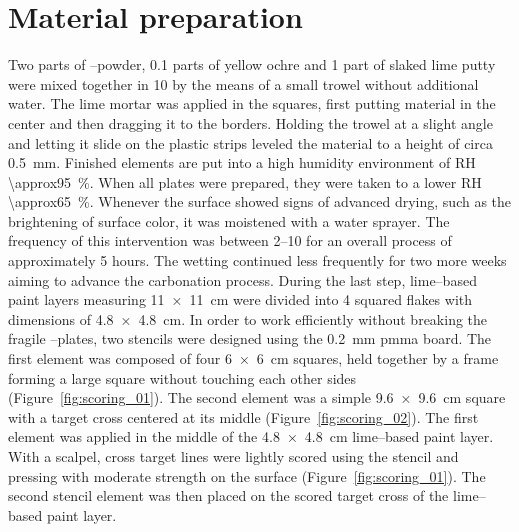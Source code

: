 \documentclass[review]{elsarticle}
\begin{document}
\section{Material preparation}
Two parts of --powder, 0.1 parts of yellow ochre and 1 part of slaked lime putty were mixed together in \SI{10}{\minutes} by the means of a small trowel without additional water.
The lime mortar was applied in the squares, first putting material in the center and then dragging it to the borders.
Holding the trowel at a slight angle and letting it slide on the plastic strips leveled the material to a height of circa \SI{0.5}{\mm}.
Finished elements are put into a high humidity environment of RH \SI{\approx95}{\percent}.
When all plates were prepared, they were taken to a lower RH \SI{\approx65}{\percent}.
Whenever the surface showed signs of advanced drying, such as the brightening of surface color, it was moistened with a water sprayer.
The frequency of this intervention was between \SIrange{2}{10}{\minutes} for an overall process of approximately 5 hours.
The wetting continued less frequently for two more weeks aiming to advance the carbonation process.
During the last step, lime--based paint layers measuring \SI[product-units = single]{11 x 11}{\cm} were divided into 4 squared flakes with dimensions of \SI[product-units = single]{4.8 x 4.8}{\cm}.
In order to work efficiently without breaking the fragile --plates, two stencils were designed using the \SI{0.2}{\mm} \gls{pmma} board.
The first element was composed of four  \SI[product-units = single]{6 x 6}{\cm} squares, held together by a frame forming a large square without touching each other sides (Figure~\ref{fig:scoring_01}).
The second element was a simple \SI[product-units = single]{9.6 x 9.6}{\cm} square with a target cross centered at its middle (Figure~\ref{fig:scoring_02}).
The first element was applied in the middle of the  \SI[product-units = single]{4.8 x 4.8}{\cm} lime--based paint layer.
With a scalpel, cross target lines were lightly scored using the stencil and pressing with moderate strength on the surface (Figure~\ref{fig:scoring_01}).
The second stencil element was then placed on the scored target cross of the lime--based paint layer.
\end{document}
